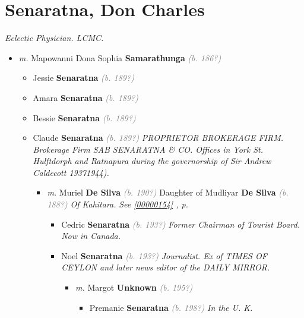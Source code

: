 \documentclass[10pt, openany]{book}
\begin{document}
\chapter{Senaratna, Don Charles}
\label{00000722}
\textcolor{slmaroon}{\textit{Eclectic Physician.
LCMC.}}
\begin{itemize}
\item{\textit{m.} Mapowanni Dona Sophia \textbf{Samarathunga} \textcolor{gray}{\textit{(b. 186?)}}   \label{couple:00000692:00000722} \begin{itemize}
\item{Jessie \textbf{Senaratna} \textcolor{gray}{\textit{(b. 189?)}}
 }
\item{Amara \textbf{Senaratna} \textcolor{gray}{\textit{(b. 189?)}}
 }
\item{Bessie \textbf{Senaratna} \textcolor{gray}{\textit{(b. 189?)}}
 }
\item{Claude \textbf{Senaratna} \textcolor{gray}{\textit{(b. 189?)}} \textcolor{slmaroon}{\textit{PROPRIETOR BROKERAGE FIRM.
Brokerage Firm SAB SENARATNA \& CO. Offices in York St. Hulftdorph and Ratnapura during the governorship of Sir Andrew Caldecott 19371944).}}
\begin{itemize}
\item{\textit{m.} Muriel \textbf{De Silva} \textcolor{gray}{\textit{(b. 190?)}} Daughter of  Mudliyar \textbf{De Silva} \textcolor{gray}{\textit{(b. 188?)}} \textcolor{slmaroon}{\textit{Of Kahitara.}} \textcolor{slteal}{\textit{See  \autoref{00000154} \textit{, p. \pageref{00000154} }}}   \label{couple:00000155:00000717} \begin{itemize}
\item{Cedric \textbf{Senaratna} \textcolor{gray}{\textit{(b. 193?)}} \textcolor{slmaroon}{\textit{Former Chairman of Tourist Board. Now in Canada.}}
 }
\item{Noel \textbf{Senaratna} \textcolor{gray}{\textit{(b. 193?)}} \textcolor{slmaroon}{\textit{Journalist.
Ex of TIMES OF CEYLON and later news editor of the DAILY MIRROR.}}
\begin{itemize}
\item{\textit{m.} Margot \textbf{Unknown} \textcolor{gray}{\textit{(b. 195?)}}   \label{couple:00000758:00000891} \begin{itemize}
\item{Premanie \textbf{Senaratna} \textcolor{gray}{\textit{(b. 198?)}} \textcolor{slmaroon}{\textit{In the U. K.}}
}
\end{itemize}}
\end{itemize}}
\end{itemize}}
\end{itemize}}
\end{itemize}}
\end{itemize}
\end{document}
